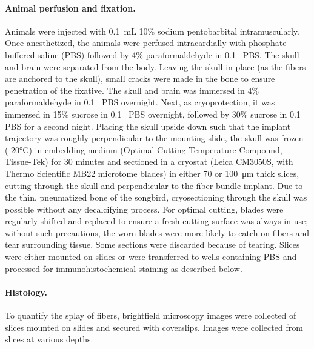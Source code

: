 \paragraph{Animal perfusion and fixation.} Animals were injected 
with 0.1~\si{\milli\liter} 10\% 
sodium pentobarbital intramuscularly. Once anesthetized, the animals 
were perfused intracardially with phosphate-buffered saline (PBS) 
followed by 4\% paraformaldehyde in 0.1~\si{\Molar} PBS. The skull and brain 
were separated from the body. Leaving the skull in place (as the 
fibers are anchored to the skull), small cracks were made in the bone 
to ensure penetration of the fixative. The skull and brain was 
immersed in 4\% paraformaldehyde in 0.1~\si{\Molar} PBS overnight. Next, as 
cryoprotection, it was immersed in 15\% sucrose in 0.1~\si{\Molar} PBS overnight, 
followed by 30\% sucrose in 0.1~\si{\Molar} PBS for a second night. Placing the 
skull upside down such that the implant trajectory was roughly 
perpendicular to the mounting slide, the skull was frozen (-20\si{\celsius}) 
in embedding medium (Optimal Cutting Temperature Compound, Tissue-Tek) 
for 30 minutes and sectioned 
in a cryostat (Leica CM3050S, with Thermo Scientific MB22 microtome 
blades) in either 70 or 100~\si{\micro\meter} thick slices, 
cutting through the skull and perpendicular to the fiber bundle implant. 
Due to the thin, pneumatized bone of the songbird, cryosectioning 
through the skull was possible without any decalcifying process. 
For optimal cutting, blades were regularly shifted and replaced 
to ensure a fresh cutting surface was always in use; without such 
precautions, the worn blades were more likely to catch on fibers 
and tear surrounding tissue. 
Some sections were discarded because of tearing. Slices were 
either mounted on slides or were transferred to wells 
containing PBS and processed for immunohistochemical staining 
as described below.

\paragraph{Histology.} To quantify the splay of fibers, brightfield 
microscopy images were collected of slices mounted on slides and 
secured with coverslips. Images were collected from slices at various 
depths.


